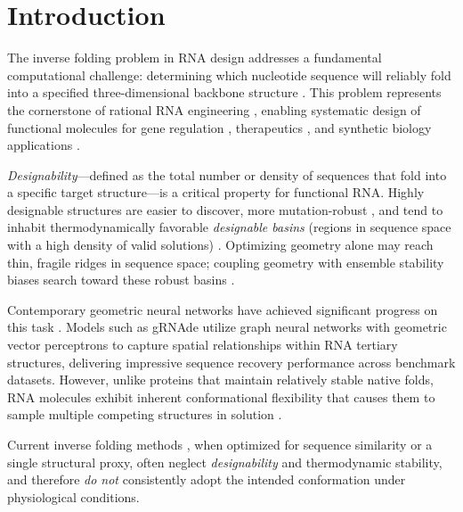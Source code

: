 \section{Introduction}

The inverse folding problem in RNA design addresses a fundamental computational challenge: determining which nucleotide sequence will reliably fold into a specified three-dimensional backbone structure \citep{tang2024survey,tan2025r3design}. This problem represents the cornerstone of rational RNA engineering \citep{wong2024deep}, enabling systematic design of functional molecules for gene regulation \citep{green2014toehold}, therapeutics \citep{yip2024therapeutic}, and synthetic biology applications \citep{pfeifer2023harnessing}.

{
\emph{Designability}—defined as the total number or density of sequences that fold into a specific target structure—is a critical property for functional RNA. Highly designable structures are easier to discover, more mutation-robust \citep{england2003naturalselectdesignablefold}, and tend to inhabit thermodynamically favorable \emph{designable basins} (regions in sequence space with a high density of valid solutions) \citep{designability_li_1996}. Optimizing geometry alone may reach thin, fragile ridges in sequence space; coupling geometry with ensemble stability biases search toward these robust basins \citep{schuster1994rna2dshape}.
}

Contemporary geometric neural networks have achieved significant progress on this task \citep{wu2023integration,wu2023hierarchical,liu2025sentences,patil2024towards}. Models such as gRNAde \citep{joshi2025grnade} utilize graph neural networks with geometric vector perceptrons to capture spatial relationships within RNA tertiary structures, delivering impressive sequence recovery performance across benchmark datasets. 
{ However, unlike proteins that maintain relatively stable native folds, RNA molecules exhibit inherent conformational flexibility that causes them to sample multiple competing structures in solution \citep{ganser2019roles, zadeh2011nucleic}.}

Current inverse folding methods \citep{Hou2025ridiffusion, wong2024deep}, when optimized for sequence similarity or a single structural proxy, often neglect \emph{designability} and thermodynamic stability, and therefore \emph{do not} consistently adopt the intended conformation under physiological conditions.

